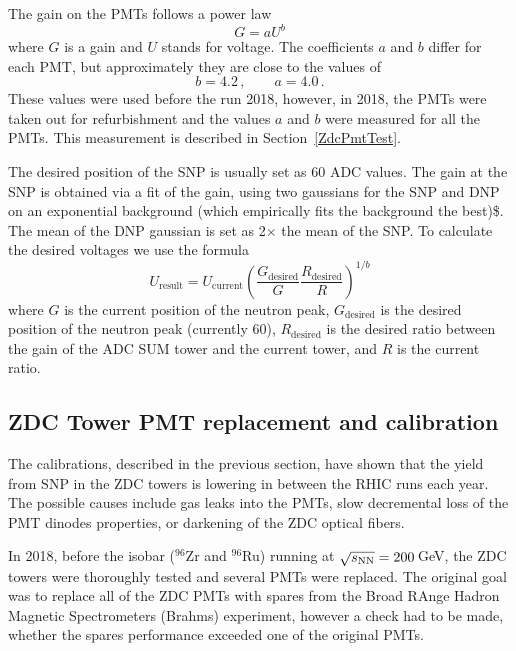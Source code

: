 The gain on the PMTs follows a power law
\begin{equation} \label{powerLaw}
G = aU^b
\end{equation}
where $G$ is a gain and $U$ stands for voltage. The coefficients $a$ and $b$ differ for each PMT, but approximately they are close to the values of~\cite{ZDCvoltsDependence}
\begin{equation}
b=4.2\,, \qquad a=4.0\,.
\end{equation}
These values were used before the run 2018, however, in 2018, the PMTs were taken out for refurbishment and the values $a$ and $b$ were measured for all the PMTs. This measurement is described in Section~\ref{ZdcPmtTest}.

The desired position of the SNP is usually set as 60 ADC values. The gain at the SNP is obtained via a fit of the gain, using two gaussians for the SNP and DNP on an exponential background (which empirically fits the background the best)\$. The mean of the DNP gaussian is set as 2$\times$ the mean of the SNP\@.
To calculate
the desired voltages we use the formula
\begin{equation}
U_{\text{result}} = U_\text{current}\left(\frac{G_\text{desired}}{G} 
\frac{R_\text{desired}}{R}\right)^{1/b}
\end{equation}
where $G$ is the current position of the neutron peak, $G_\text{desired}$ is the desired position
of the neutron peak (currently 60), $R_\text{desired}$ is the desired ratio between the gain of the ADC SUM
tower and the current tower, and $R$ is the current ratio.



\subsection{\label{ZdcPmtTest}ZDC Tower PMT replacement and calibration}
The calibrations, described in the previous section, have shown that the yield from SNP in the ZDC towers is lowering in between the RHIC runs each year. The possible causes include gas leaks into the PMTs, slow decremental loss of the PMT dinodes properties, or darkening of the ZDC optical fibers. 

In 2018, before the isobar (${}^{96}$Zr and ${}^{96}$Ru) running at $\sqrt{s_\text{NN}} = 200\,$GeV, the ZDC towers were thoroughly tested and several PMTs were replaced. The original goal was to replace all of the ZDC PMTs with spares from the Broad RAnge Hadron Magnetic Spectrometers (Brahms) experiment, however a check had to be made, whether the spares performance exceeded one of the original PMTs.

